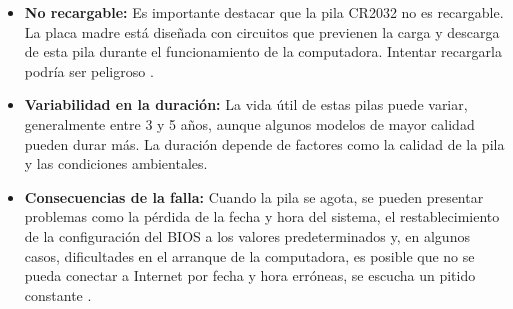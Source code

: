 \begin{itemize}
  \item \textbf{No recargable:} Es importante destacar que la pila CR2032 no es recargable. La placa madre está diseñada con circuitos que previenen la carga y descarga de esta pila durante el funcionamiento de la computadora. Intentar recargarla podría ser peligroso \cite{pcworldpila}.
  \item \textbf{Variabilidad en la duración:} La vida útil de estas pilas puede variar, generalmente entre 3 y 5 años, aunque algunos modelos de mayor calidad pueden durar más. La duración depende de factores como la calidad de la pila y las condiciones ambientales.
  \item \textbf{Consecuencias de la falla:} Cuando la pila se agota, se pueden presentar problemas como la pérdida de la fecha y hora del sistema, el restablecimiento de la configuración del BIOS a los valores predeterminados y, en algunos casos, dificultades en el arranque de la computadora, es posible que no se pueda conectar a Internet por fecha y hora erróneas, se escucha un pitido constante \cite{vasycpila} .
\end{itemize}
